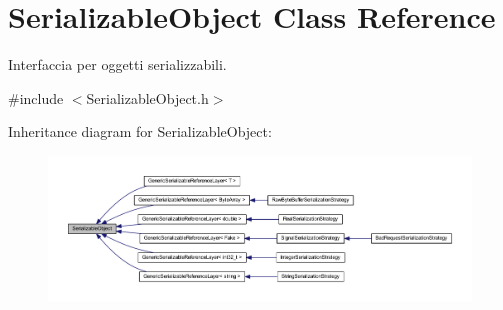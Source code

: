 \hypertarget{class_serializable_object}{
\section{SerializableObject Class Reference}
\label{class_serializable_object}
}


Interfaccia per oggetti serializzabili.  




{\ttfamily \#include $<$SerializableObject.h$>$}



Inheritance diagram for SerializableObject:\nopagebreak
\begin{figure}[H]
\begin{center}
\leavevmode
\includegraphics[width=400pt]{class_serializable_object__inherit__graph}
\end{center}
\end{figure}
